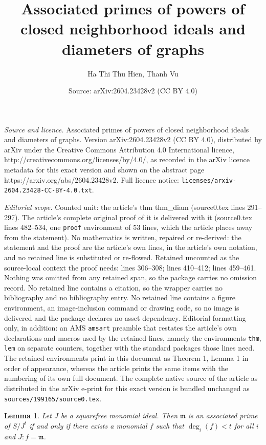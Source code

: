 \documentclass[10pt,a4paper]{amsart}
\title{Associated primes of powers of closed neighborhood ideals and diameters of graphs}
\author{Ha Thi Thu Hien, Thanh Vu}
\date{Source: arXiv:2604.23428v2 (CC BY 4.0)}
\newtheorem{lem}{Lemma}
\newcommand{\mm}{\mathfrak m}
\begin{document}
\maketitle

\noindent\emph{Source and licence.} Associated primes of powers of closed neighborhood ideals and diameters of graphs. Version arXiv:2604.23428v2 (CC BY 4.0), distributed by arXiv under the Creative Commons Attribution 4.0 International licence, http://creativecommons.org/licenses/by/4.0/, as recorded in the arXiv licence metadata for this exact version and shown on the abstract page https://arxiv.org/abs/2604.23428v2. Full licence notice: \texttt{licenses/arxiv-2604.23428-CC-BY-4.0.txt}.\par\smallskip

\noindent\textit{Editorial scope.} Counted unit: the article's thm thm\_diam (source0.tex lines 291--297). The article's complete original proof of it is delivered with it (source0.tex lines 482--534, one \texttt{proof} environment of 53 lines, which the article places away from the statement). No mathematics is written, repaired or re-derived: the statement and the proof are the article's own lines, in the article's own notation, and no retained line is substituted or re-flowed.  Retained uncounted as the source-local context the proof needs: lines 306--308; lines 410--412; lines 459--461.  Nothing was omitted from any retained span, so the package carries no omission record.  No retained line contains a citation, so the wrapper carries no bibliography and no bibliography entry.  No retained line contains a figure environment, an image-inclusion command or drawing code, so no image is delivered and the package declares no asset dependency.  Editorial formatting only, in addition: an AMS \texttt{amsart} preamble that restates the article's own declarations and macros used by the retained lines, namely the environments \texttt{thm}, \texttt{lem} on separate counters, together with the standard packages those lines need.  The retained environments print in this document as Theorem 1, Lemma 1 in order of appearance, whereas the article prints the same items with the numbering of its own full document.  The complete native source of the article as distributed in the arXiv e-print for this exact version is bundled unchanged as \texttt{sources/199165/source0.tex}.
\begin{lem}\label{lem_quotient}
Let $J$ be a squarefree monomial ideal. Then $\mm$ is an associated prime of $S/J^t$ if and only if there exists a monomial $f$ such that $\deg_i(f) < t$ for all $i$ and $J : f = \mm$.
\end{lem}
\end{document}
